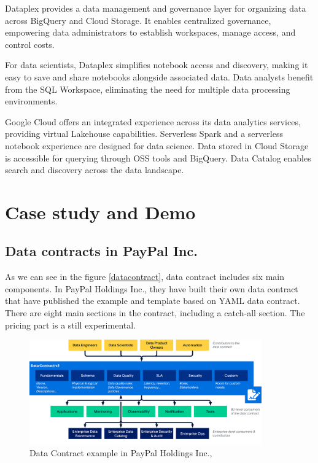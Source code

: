 \documentclass[12pt, a4paper]{book}
\begin{document}
Dataplex provides a data management and governance layer for organizing data across BigQuery and Cloud Storage. It enables centralized governance, empowering data administrators to establish workspaces, manage access, and control costs.

For data scientists, Dataplex simplifies notebook access and discovery, making it easy to save and share notebooks alongside associated data. Data analysts benefit from the SQL Workspace, eliminating the need for multiple data processing environments.

Google Cloud offers an integrated experience across its data analytics services, providing virtual Lakehouse capabilities. Serverless Spark and a serverless notebook experience are designed for data science. Data stored in Cloud Storage is accessible for querying through OSS tools and BigQuery. Data Catalog enables search and discovery across the data landscape.

\section{Case study and Demo}
\subsection{Data contracts in PayPal Inc.}
As we can see in the figure \ref{datacontract}, data contract includes six main components. In PayPal Holdings Inc., they have built their own data contract that have published the example and template based on YAML data contract. There are eight main sections in the contract, including a catch-all section. The pricing part is a still experimental.

\begin{figure}[ht]
	\begin{framed}
		\centering
		\includegraphics[width=10cm]{datacontractPayPal.png}
		\caption{Data Contract example in PayPal Holdings Inc.,}
		\label{DataContractPayPal}
	\end{framed}
\end{figure}
\end{document}
